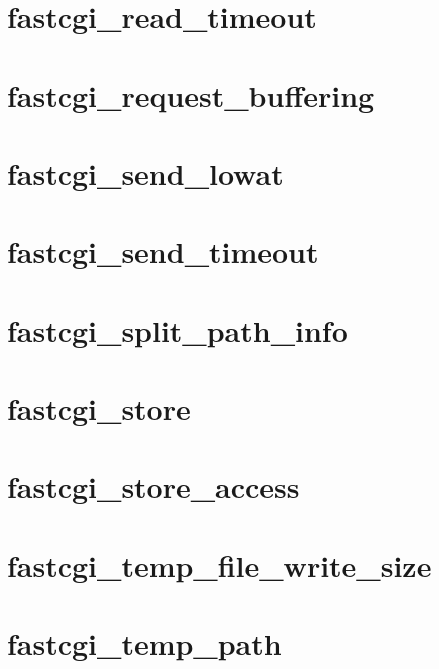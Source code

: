 \section{fastcgi\_read\_timeout}
\section{fastcgi\_request\_buffering}
\section{fastcgi\_send\_lowat}
\section{fastcgi\_send\_timeout}
\section{fastcgi\_split\_path\_info}
\section{fastcgi\_store}
\section{fastcgi\_store\_access}
\section{fastcgi\_temp\_file\_write\_size}
\section{fastcgi\_temp\_path}

\begin{lstlisting}

\end{lstlisting}




\begin{lstlisting}

\end{lstlisting}




\begin{lstlisting}

\end{lstlisting}





\begin{lstlisting}

\end{lstlisting}






